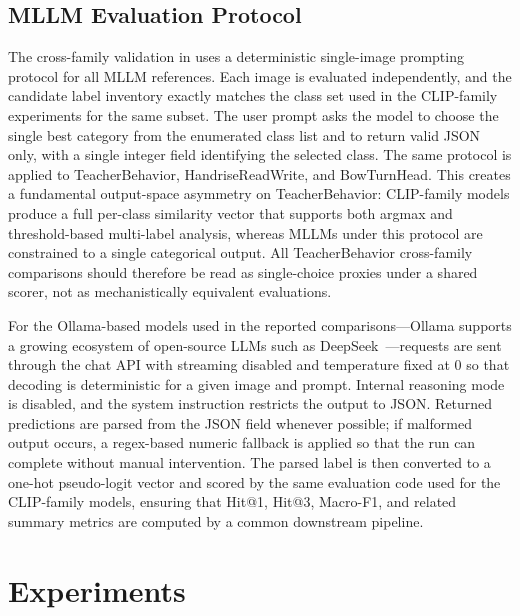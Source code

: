 \documentclass[symmetry,article,submit,pdftex,moreauthors]{Definitions/mdpi}
\begin{document}
\subsection{MLLM Evaluation Protocol}
\label{sec:mllm_protocol}

The cross-family validation in  uses a deterministic single-image prompting protocol for all MLLM references. Each image is evaluated independently, and the candidate label inventory exactly matches the class set used in the CLIP-family experiments for the same subset. The user prompt asks the model to choose the single best category from the enumerated class list and to return valid JSON only, with a single integer field identifying the selected class. The same protocol is applied to TeacherBehavior, HandriseReadWrite, and BowTurnHead. This creates a fundamental output-space asymmetry on TeacherBehavior: CLIP-family models produce a full per-class similarity vector that supports both argmax and threshold-based multi-label analysis, whereas MLLMs under this protocol are constrained to a single categorical output. All TeacherBehavior cross-family comparisons should therefore be read as single-choice proxies under a shared scorer, not as mechanistically equivalent evaluations.

For the Ollama-based models used in the reported comparisons—Ollama supports a growing ecosystem of open-source LLMs such as DeepSeek~\cite{deng2025deepseek}—requests are sent through the chat API with streaming disabled and temperature fixed at 0 so that decoding is deterministic for a given image and prompt. Internal reasoning mode is disabled, and the system instruction restricts the output to JSON. Returned predictions are parsed from the JSON field whenever possible; if malformed output occurs, a regex-based numeric fallback is applied so that the run can complete without manual intervention. The parsed label is then converted to a one-hot pseudo-logit vector and scored by the same evaluation code used for the CLIP-family models, ensuring that Hit@1, Hit@3, Macro-F1, and related summary metrics are computed by a common downstream pipeline.


\section{Experiments}
\label{sec:experiments}
\end{document}
